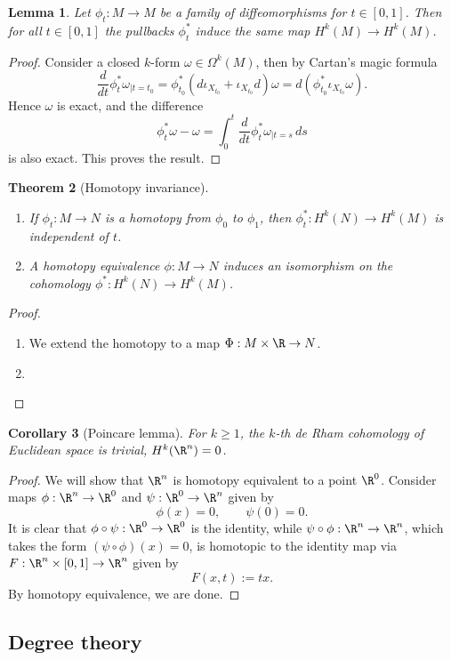 \documentclass[reqno]{amsart}
\newtheorem{theorem}{Theorem}
\newtheorem{lemma}[theorem]{Lemma}
\newtheorem{corollary}[theorem]{Corollary}
\theoremstyle{definition}
\theoremstyle{remark}
\begin{document}
\begin{lemma}
	Let $\phi_t : M \to M$ be a family of diffeomorphisms for $t \in [0, 1]$. Then for all $t \in [0, 1]$ the pullbacks $\phi^*_t$ induce the same map $H^k (M) \to H^k (M)$. 
\end{lemma}

\begin{proof}
	Consider a closed $k$-form $\omega \in \Omega^k (M)$, then by Cartan's magic formula
		\[ \frac{d}{dt} \phi^*_t \omega_{|t = t_0} = \phi^*_{t_0} (d \iota_{X_{t_0}} + \iota_{X_{t_0}} d) \omega = d (\phi^*_{t_0} \iota_{X_{t_0}} \omega). \]
	Hence $\omega$ is exact, and the difference
		\[ \phi^*_t \omega - \omega = \int_0^t \frac{d}{dt} \phi^*_t \omega_{|t = s} \, ds \]
	is also exact. This proves the result. 		
\end{proof}


\begin{theorem}[Homotopy invariance]
\leavevmode
\begin{enumerate}
	\item If $\phi_t : M \to N$ is a homotopy from $\phi_0$ to $\phi_1$, then $\phi_t^* : H^k (N) \to H^k (M)$ is independent of $t$. 
	\item A homotopy equivalence $\phi : M \to N$ induces an isomorphism on the cohomology $\phi^* : H^k (N) \to H^k (M)$. 
\end{enumerate}
\end{theorem}

\begin{proof}
\leavevmode
\begin{enumerate}
	\item We extend the homotopy to a map $\Phi : M \times \R \to N$. 
	
	\item 
\end{enumerate}
\end{proof}

\begin{corollary}[Poincare lemma]
	For $k \geq 1$, the $k$-th de Rham cohomology of Euclidean space is trivial, $H^k (\R^n) = 0$.
\end{corollary}

\begin{proof}
	We will show that $\R^n$ is homotopy equivalent to a point $\R^0$. Consider maps $\phi : \R^n \to \R^0$ and $\psi : \R^0 \to \R^n$ given by 
		\[ \phi(x) = 0, \qquad \psi(0) = 0.  \]
	It is clear that $\phi \circ \psi : \R^0 \to \R^0$ is the identity, while $\psi \circ \phi : \R^n \to \R^n$, which takes the form $(\psi \circ \phi)(x) = 0$, is homotopic to the identity map via $F: \R^n \times [0, 1] \to \R^n$ given by
		\[ F(x, t) := tx. \]
	By homotopy equivalence, we are done. 	
\end{proof}

\subsection{Degree theory}
\end{document}

